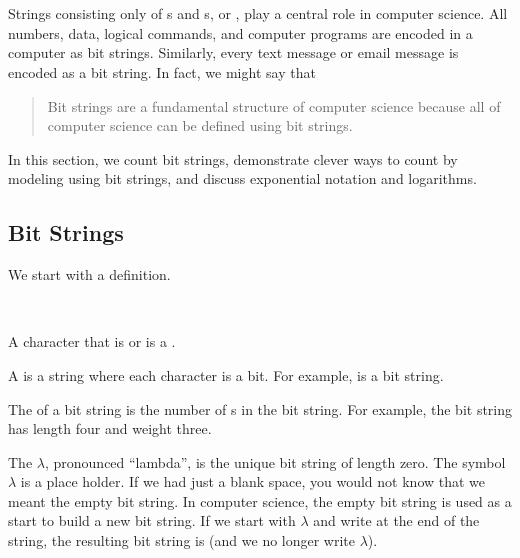 \section{\secbitstrings}
\label{sec_bit_strings}

Strings consisting only of s and s, or , play a central role in computer science. All numbers, data, logical commands, and computer programs are encoded in a computer as bit strings. Similarly, every text message or email message is encoded as a bit string. In fact, we might say that 
\begin{quote}
    Bit strings are a fundamental structure of computer science because all of computer science can be defined using bit strings.   
\end{quote}

In this section, we count bit strings, demonstrate clever ways to count by modeling using bit strings, and discuss exponential notation and logarithms.

\newcommand{\subbitstrings}{Bit Strings}
\subsection{\subbitstrings}
\label{sub_bitstrings}

We start with a definition.

\begin{defn} 
\label{defn_bit_string}
~
    \begin{apart}
        \item A character that is  or  is a .
        \item A  is a string where each character is a bit. For example,  is a bit string.  
        \item The  of a bit string is the number of s in the bit string. For example, the bit string  has length four and weight three.
        \item The  $\lambda$, pronounced ``lambda'', is the unique bit string of length zero.  The symbol $\lambda$ is a place holder.  If we had just a blank space, you would not know that we meant the empty bit string.  In computer science, the empty bit string is used as a start to build a new bit string.  If we start with $\lambda$ and write  at the end of the string, the resulting bit string is  (and we no longer write $\lambda$).
    \end{apart}  
\end{defn}

